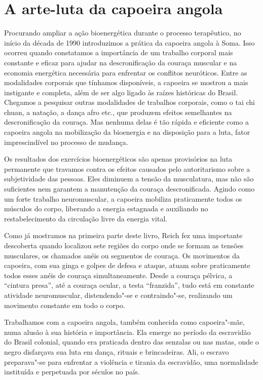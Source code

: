 \section{A arte-luta da capoeira angola}

Procurando ampliar a ação bioenergética durante o processo terapêutico,
no início da década de 1990 introduzimos a prática da capoeira angola à
Soma. Isso ocorreu quando constatamos a importância de um trabalho
corporal mais constante e eficaz para ajudar na descronificação da
couraça muscular e na economia energética necessária para enfrentar os
conflitos neuróticos. Entre as modalidades corporais que tínhamos
disponíveis, a capoeira se mostrou a mais instigante e completa, além de
ser algo ligado às raízes históricas do Brasil. Chegamos a pesquisar
outras modalidades de trabalhos corporais, como o tai chi chuan, a
natação, a dança afro etc., que produzem efeitos semelhantes na
descronificação da couraça. Mas nenhuma delas é tão rápida e eficiente
como a capoeira angola na mobilização da bioenergia e na disposição para
a luta, fator imprescindível no processo de mudança.

Os resultados dos exercícios bioenergéticos são apenas provisórios na
luta permanente que travamos contra os efeitos causados pelo
autoritarismo sobre a subjetividade das pessoas. Eles diminuem a tensão
da musculatura, mas não são suficientes nem garantem a manutenção da
couraça descronificada. Agindo como um forte trabalho neuromuscular, a
capoeira mobiliza praticamente todos os músculos do corpo, liberando a
energia estagnada e auxiliando no restabelecimento da circulação livre
da energia vital.

Como já mostramos na primeira parte deste livro, Reich fez uma
importante descoberta quando localizou sete regiões do corpo onde se
formam as tensões musculares, os chamados anéis ou segmentos de couraça.
Os movimentos da capoeira, com sua ginga e golpes de defesa e ataque,
atuam sobre praticamente todos esses anéis de couraça simultaneamente.
Desde a couraça pélvica, a ``cintura presa'', até a couraça ocular, a
testa ``franzida'', tudo está em constante atividade neuromuscular,
distendendo"-se e contraindo"-se, realizando um movimento constante em
todo o corpo.

Trabalhamos com a capoeira angola, também conhecida como capoeira"-mãe,
numa alusão à sua história e importância. Ela emerge no período da
escravidão do Brasil colonial, quando era praticada dentro das senzalas
ou nas matas, onde o negro disfarçava sua luta em dança, rituais e
brincadeiras. Ali, o escravo preparava"-se para enfrentar a violência e
tirania da escravidão, uma normalidade instituída e perpetuada por
séculos no país.

